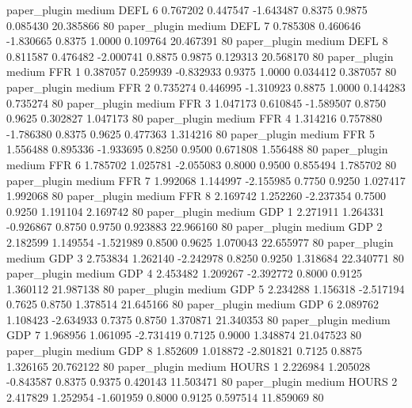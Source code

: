           paper_plugin     medium     DEFL                 6  0.767202 0.447547 -1.643487 0.8375 0.9875  0.085430   20.385866 80
          paper_plugin     medium     DEFL                 7  0.785308 0.460646 -1.830665 0.8375 1.0000  0.109764   20.467391 80
          paper_plugin     medium     DEFL                 8  0.811587 0.476482 -2.000741 0.8875 0.9875  0.129313   20.568170 80
          paper_plugin     medium      FFR                 1  0.387057 0.259939 -0.832933 0.9375 1.0000  0.034412    0.387057 80
          paper_plugin     medium      FFR                 2  0.735274 0.446995 -1.310923 0.8875 1.0000  0.144283    0.735274 80
          paper_plugin     medium      FFR                 3  1.047173 0.610845 -1.589507 0.8750 0.9625  0.302827    1.047173 80
          paper_plugin     medium      FFR                 4  1.314216 0.757880 -1.786380 0.8375 0.9625  0.477363    1.314216 80
          paper_plugin     medium      FFR                 5  1.556488 0.895336 -1.933695 0.8250 0.9500  0.671808    1.556488 80
          paper_plugin     medium      FFR                 6  1.785702 1.025781 -2.055083 0.8000 0.9500  0.855494    1.785702 80
          paper_plugin     medium      FFR                 7  1.992068 1.144997 -2.155985 0.7750 0.9250  1.027417    1.992068 80
          paper_plugin     medium      FFR                 8  2.169742 1.252260 -2.237354 0.7500 0.9250  1.191104    2.169742 80
          paper_plugin     medium      GDP                 1  2.271911 1.264331 -0.926867 0.8750 0.9750  0.923883   22.966160 80
          paper_plugin     medium      GDP                 2  2.182599 1.149554 -1.521989 0.8500 0.9625  1.070043   22.655977 80
          paper_plugin     medium      GDP                 3  2.753834 1.262140 -2.242978 0.8250 0.9250  1.318684   22.340771 80
          paper_plugin     medium      GDP                 4  2.453482 1.209267 -2.392772 0.8000 0.9125  1.360112   21.987138 80
          paper_plugin     medium      GDP                 5  2.234288 1.156318 -2.517194 0.7625 0.8750  1.378514   21.645166 80
          paper_plugin     medium      GDP                 6  2.089762 1.108423 -2.634933 0.7375 0.8750  1.370871   21.340353 80
          paper_plugin     medium      GDP                 7  1.968956 1.061095 -2.731419 0.7125 0.9000  1.348874   21.047523 80
          paper_plugin     medium      GDP                 8  1.852609 1.018872 -2.801821 0.7125 0.8875  1.326165   20.762122 80
          paper_plugin     medium    HOURS                 1  2.226984 1.205028 -0.843587 0.8375 0.9375  0.420143   11.503471 80
          paper_plugin     medium    HOURS                 2  2.417829 1.252954 -1.601959 0.8000 0.9125  0.597514   11.859069 80

